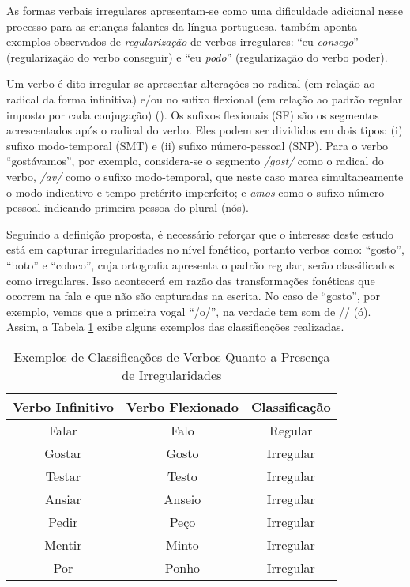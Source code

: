 As formas verbais irregulares apresentam-se como uma dificuldade adicional nesse processo para as crianças falantes da língua portuguesa. \cite{wuerges:2014} também aponta exemplos observados de \textit{regularização} de verbos irregulares: “eu \textit{consego}” (regularização do verbo conseguir) e “eu \textit{podo}” (regularização do verbo poder).

Um verbo é dito irregular se apresentar alterações no radical (em relação ao radical da forma infinitiva) e/ou no sufixo flexional (em relação ao padrão regular imposto por cada conjugação) (\cite{wuerges:2014}). Os sufixos flexionais (SF) são os segmentos acrescentados após o radical do verbo. Eles podem ser divididos em dois tipos: (i) sufixo modo-temporal (SMT) e (ii) sufixo número-pessoal (SNP). Para o verbo “gostávamos”, por exemplo, considera-se o segmento \textit{/gost/} como o radical do verbo, \textit{/av/} como o sufixo modo-temporal, que neste caso marca simultaneamente o modo indicativo e tempo pretérito imperfeito; e \textit{amos} como o sufixo número-pessoal indicando primeira pessoa do plural (nós).

Seguindo a definição proposta, é necessário reforçar que o interesse deste estudo está em capturar irregularidades no nível fonético, portanto verbos como: “gosto”, “boto” e “coloco”, cuja ortografia apresenta o padrão regular, serão classificados como irregulares. Isso acontecerá em razão das transformações fonéticas que ocorrem na fala e que não são capturadas na escrita.  No caso de “gosto”, por exemplo, vemos que a primeira vogal “/o/”, na verdade tem som de /\textopeno/ (ó). Assim, a Tabela \ref{tab:irreg} exibe alguns exemplos das classificações realizadas.

\begin{center}
\begin{table}[H]
\centering
\begin{tabular}{ccc}
\multicolumn{1}{l}{\textbf{Verbo Infinitivo}} & \multicolumn{1}{l}{\textbf{Verbo Flexionado}} & \multicolumn{1}{l}{\textbf{Classificação}} \\ \hline
Falar & Falo & Regular \\
Gostar & Gosto & Irregular \\
Testar & Testo & Irregular \\
Ansiar & Anseio & Irregular \\
Pedir & Peço & Irregular \\
Mentir & Minto & Irregular \\
Por & Ponho & Irregular
\end{tabular}
\caption{Exemplos de Classificações de Verbos Quanto a Presença de Irregularidades}
\label{tab:irreg}
\end{table}
\end{center}

